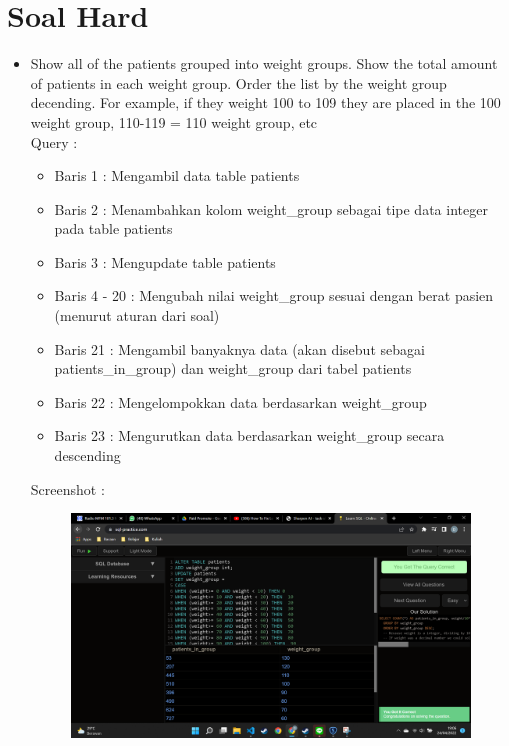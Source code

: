 \documentclass[]{article}
\begin{document}
\section{Soal Hard}
    \begin{itemize}
        \item Show all of the patients grouped into weight groups. Show the total amount of patients in each weight group. Order the list by the weight group decending. For example, if they weight 100 to 109 they are placed in the 100 weight group, 110-119 = 110 weight group, etc
        \\Query :
        
        \begin{itemize}
            \item Baris 1 : Mengambil data table patients
            \item Baris 2 : Menambahkan kolom weight\_group sebagai tipe data integer pada table patients
            \item Baris 3 : Mengupdate table patients
            \item Baris 4 - 20 : Mengubah nilai weight\_group sesuai dengan berat pasien (menurut aturan dari soal)
            \item Baris 21 : Mengambil banyaknya data (akan disebut sebagai patients\_in\_group) dan weight\_group dari tabel patients
            \item Baris 22 : Mengelompokkan data berdasarkan weight\_group
            \item Baris 23 : Mengurutkan data berdasarkan weight\_group secara descending
        \end{itemize}
        \pagebreak
        Screenshot :
        \begin{figure}[h]
            \includegraphics[scale=0.3]{./Screenshot/Hard-1.png}
            \centering
        \end{figure}


\end{itemize}
\end{document}
